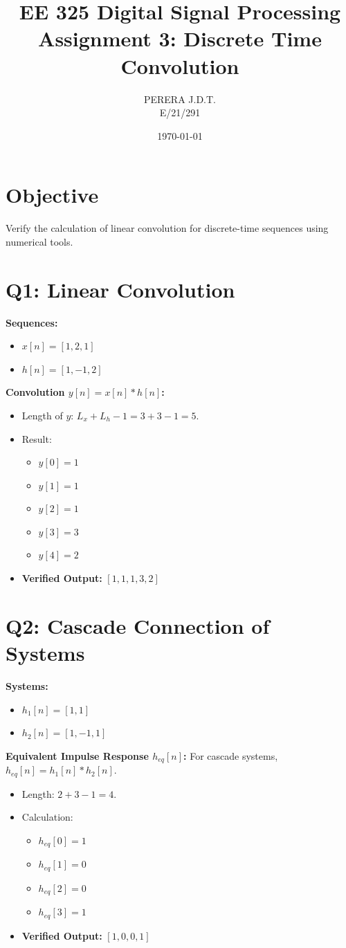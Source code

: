 \documentclass[11pt, a4paper]{article}
\title{EE 325 Digital Signal Processing \\ Assignment 3: Discrete Time Convolution}
\author{PERERA J.D.T. \\ E/21/291}
\date{\today}
\begin{document}
\maketitle

\section{Objective}
Verify the calculation of linear convolution for discrete-time sequences using numerical tools.

\section{Q1: Linear Convolution}
\textbf{Sequences:}
\begin{itemize}
    \item $x[n] = [1, 2, 1]$
    \item $h[n] = [1, -1, 2]$
\end{itemize}

\textbf{Convolution $y[n] = x[n] * h[n]$:}
\begin{itemize}
    \item Length of $y$: $L_x + L_h - 1 = 3 + 3 - 1 = 5$.
    \item Result:
    \begin{itemize}
        \item $y[0] = 1$
        \item $y[1] = 1$
        \item $y[2] = 1$
        \item $y[3] = 3$
        \item $y[4] = 2$
    \end{itemize}
    \item \textbf{Verified Output:} $[1, 1, 1, 3, 2]$
\end{itemize}

\section{Q2: Cascade Connection of Systems}
\textbf{Systems:}
\begin{itemize}
    \item $h_1[n] = [1, 1]$
    \item $h_2[n] = [1, -1, 1]$
\end{itemize}

\textbf{Equivalent Impulse Response $h_{eq}[n]$:}
For cascade systems, $h_{eq}[n] = h_1[n] * h_2[n]$.
\begin{itemize}
    \item Length: $2 + 3 - 1 = 4$.
    \item Calculation:
    \begin{itemize}
        \item $h_{eq}[0] = 1$
        \item $h_{eq}[1] = 0$
        \item $h_{eq}[2] = 0$
        \item $h_{eq}[3] = 1$
    \end{itemize}
    \item \textbf{Verified Output:} $[1, 0, 0, 1]$
\end{itemize}
\end{document}
